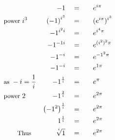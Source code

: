 \begin{alignat*}{5}
&\,&-1\quad&=\quad&&e^{i\pi}\\
&\small\text{power }i^3&\left(-1\right)^{i^3}\quad&=&&(e^{i\pi})^{i^3}\\
&\,&-1^{i^2i}\quad&=&&e^{i^4\pi}\\
&\,&-1^{-1i}\quad&=&&e^{(i^2)^2\pi}\\
&\,&-1^{-i}\quad&=&&e^{-1^2\pi}\\
&\,&-1^{-i}\quad&=&&e^{1\pi}\\
&\small\text{as }-i=\frac{1}{i}&-1^\frac{1}{i}\quad&=&&e^\pi\\
&\small\text{power }2&-1^\frac{2}{i}\quad&=&&e^{2\pi}\\
&\,&\left(-1^2\right)^\frac{1}{i}\quad&=&&e^{2\pi}\\
&\,&\quad1^{\frac{1}{i}}\quad&=&&e^{2\pi}\\
&\qquad\small\text{Thus}&\sqrt[^i]{1}\quad&=&&e^{2\pi}
\end{alignat*}
